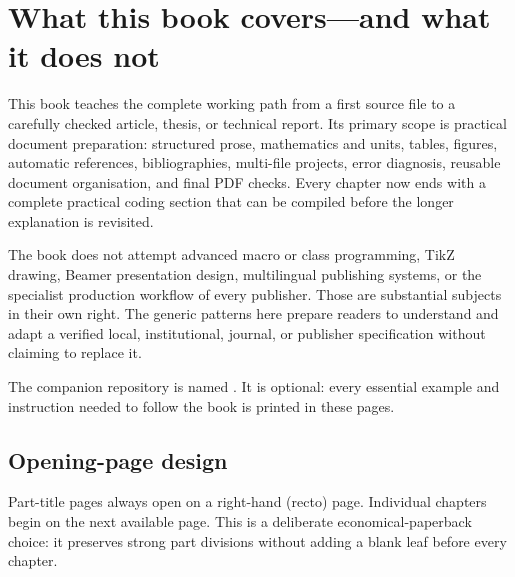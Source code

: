 \chapter*{What this book covers---and what it does not}

This book teaches the complete working path from a first source file to a
carefully checked article, thesis, or technical report. Its primary scope is
practical document preparation: structured prose, mathematics and units,
tables, figures, automatic references, bibliographies, multi-file projects,
error diagnosis, reusable document organisation, and final PDF checks. Every
chapter now ends with a complete practical coding section that can be compiled
before the longer explanation is revisited.

The book does not attempt advanced macro or class programming, TikZ drawing,
Beamer presentation design, multilingual publishing systems, or the specialist
production workflow of every publisher. Those are substantial subjects in
their own right. The generic patterns here prepare readers to understand and
adapt a verified local, institutional, journal, or publisher specification
without claiming to replace it.

The companion repository is named
. It is optional: every essential example
and instruction needed to follow the book is printed in these pages.

\section*{Opening-page design}

Part-title pages always open on a right-hand (recto) page. Individual chapters
begin on the next available page. This is a deliberate economical-paperback
choice: it preserves strong part divisions without adding a blank leaf before
every chapter.
